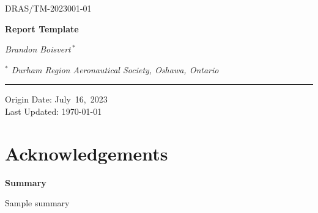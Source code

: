 \documentclass[12 pt]{article}
\makeatletter
\newcommand{\version}{01}
\newcommand{\pubyear}{2023}
\newcommand{\origyear}{2023}
\newcommand{\origmonth}{July}
\newcommand{\origday}{16}
\newcommand{\department}{DRAS}
\newcommand{\pubcat}{TM}
\newcommand{\docnumber}{001}
\newcommand{\codegen}{\department/\pubcat-\pubyear\docnumber-\version}
\newcommand{\doctitle}{Report Template}
\newcommand{\authorgen}{Brandon Boisvert$^{\ *}$}
\renewcommand\abstractname{Summary}
\renewenvironment{abstract}{
      \begin{center}
        {\bfseries \Large\abstractname\vspace{\z@}}
      \end{center}
  \quotation}
\makeatother
\begin{document}

\begin{titlepage}
    \begin{flushleft}
        \begin{large}
            \codegen\\
        \end{large}
        \begin{huge}
            \vspace{0.5cm}
            \textbf{\doctitle}\\
        \end{huge}
            \vspace{0.5cm}
            \emph{\authorgen}\\
    \end{flushleft}
        \vfill

    \begin{flushleft}
        \emph{$^{*}$ Durham Region Aeronautical Society, Oshawa, Ontario}\\ 
    \end{flushleft}
    \rule{\textwidth}{2pt}
    \begin{flushleft}
        Origin Date: \origmonth\ \origday,\ \origyear\\
        Last Updated: \today
    \end{flushleft}
\end{titlepage}
\clearpage



\section*{Acknowledgements}
\clearpage
\begin{abstract}
    Sample summary
\end{abstract}    

\clearpage
\tableofcontents
{}
\clearpage
{}
\listoftables
\clearpage
{}
\listoffigures
\clearpage
{}
\printnomenclature
\clearpage
\end{document}
